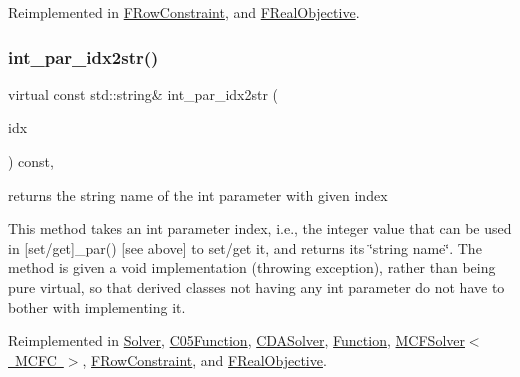 Reimplemented in \mbox{\hyperlink{class_s_m_spp__di__unipi__it_1_1_f_row_constraint_a3e17318e51ccc01da85e2627b810d6a7}{F\+Row\+Constraint}}, and \mbox{\hyperlink{class_s_m_spp__di__unipi__it_1_1_f_real_objective_a3e17318e51ccc01da85e2627b810d6a7}{F\+Real\+Objective}}.

\mbox{\label{class_s_m_spp__di__unipi__it_1_1_thin_compute_interface_a3d3d1ca3218d2d640614ed75a960ef01}} 
\subsubsection{\texorpdfstring{int\+\_\+par\+\_\+idx2str()}{int\_par\_idx2str()}}
{\footnotesize\ttfamily virtual const std\+::string\& int\+\_\+par\+\_\+idx2str (\begin{DoxyParamCaption}\item[{const \mbox{\hyperlink{class_s_m_spp__di__unipi__it_1_1_thin_compute_interface_aa3d710629ad8c434286726ad810c3b47}{idx\+\_\+type}}}]{idx }\end{DoxyParamCaption}) const\hspace{0.3cm}{\ttfamily [inline]}, {\ttfamily [virtual]}}



returns the string name of the int parameter with given index 

This method takes an int parameter index, i.\+e., the integer value that can be used in \mbox{[}set/get\mbox{]}\+\_\+par() \mbox{[}see above\mbox{]} to set/get it, and returns its \char`\"{}string name\char`\"{}. The method is given a void implementation (throwing exception), rather than being pure virtual, so that derived classes not having any int parameter do not have to bother with implementing it. 

Reimplemented in \mbox{\hyperlink{class_s_m_spp__di__unipi__it_1_1_solver_a61e973f39747f63b8f56d97cc62e32ce}{Solver}}, \mbox{\hyperlink{class_s_m_spp__di__unipi__it_1_1_c05_function_a61e973f39747f63b8f56d97cc62e32ce}{C05\+Function}}, \mbox{\hyperlink{class_s_m_spp__di__unipi__it_1_1_c_d_a_solver_a61e973f39747f63b8f56d97cc62e32ce}{C\+D\+A\+Solver}}, \mbox{\hyperlink{class_s_m_spp__di__unipi__it_1_1_function_a61e973f39747f63b8f56d97cc62e32ce}{Function}}, \mbox{\hyperlink{class_s_m_spp__di__unipi__it_1_1_m_c_f_solver_a61e973f39747f63b8f56d97cc62e32ce}{M\+C\+F\+Solver$<$ M\+C\+F\+C $>$}}, \mbox{\hyperlink{class_s_m_spp__di__unipi__it_1_1_f_row_constraint_a61e973f39747f63b8f56d97cc62e32ce}{F\+Row\+Constraint}}, and \mbox{\hyperlink{class_s_m_spp__di__unipi__it_1_1_f_real_objective_a61e973f39747f63b8f56d97cc62e32ce}{F\+Real\+Objective}}.

